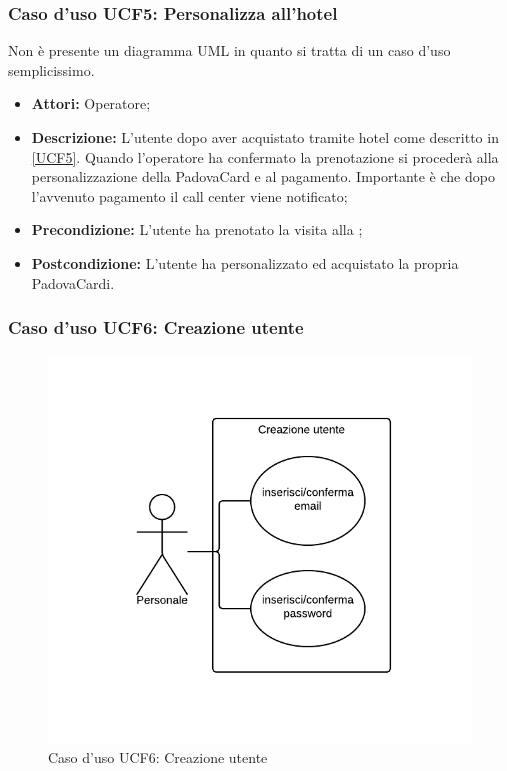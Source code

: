 \subsubsection{Caso d'uso UCF5: Personalizza all'hotel}
Non è presente un diagramma UML in quanto si tratta di un caso d'uso semplicissimo.
\begin{itemize}
\item \textbf{Attori:} Operatore;
\item \textbf{Descrizione:} L'utente dopo aver acquistato tramite hotel come descritto in \ref{UCF5}. Quando l'operatore ha confermato la prenotazione si procederà alla personalizzazione della PadovaCard e al pagamento. Importante è che dopo l'avvenuto pagamento il call center viene notificato;
\item \textbf{Precondizione:} L'utente ha prenotato la visita alla \cappella;
\item \textbf{Postcondizione:} L'utente ha personalizzato ed acquistato la propria PadovaCardi.
\end{itemize}

\subsubsection{Caso d'uso UCF6: Creazione utente}
\begin{figure}[H]
\centering
\includegraphics[width=1\textwidth]{images/UCF6.png}
\caption{Caso d'uso UCF6: Creazione utente}
\end{figure}

